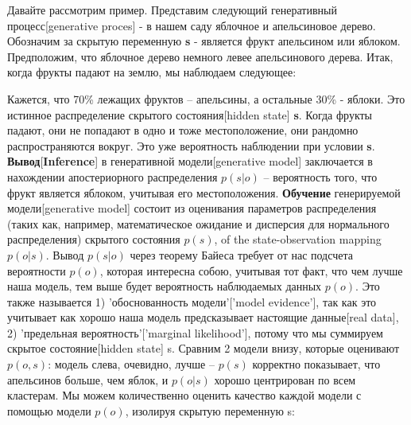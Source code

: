 \documentclass[twoside,leqno, 11pt]{article}
\begin{document}
	Давайте рассмотрим пример. Представим следующий генеративный процесс[generative proces] - в нашем саду яблочное и апельсиновое дерево. Обозначим за скрытую переменную \textbf{s} - является фрукт апельсином или яблоком. Предположим, что яблочное дерево немного левее апельсинового дерева. Итак, когда фрукты падают на землю, мы наблюдаем следующее:

	\begin{figure}[h]
		\label{ris:image}
	\end{figure}
	
	Кажется, что 70\% лежащих фруктов -- апельсины, а остальные 30\% - яблоки. Это истинное распределение скрытого состояния[hidden state] \textbf{s}. Когда фрукты падают, они не попадают в одно и тоже местоположение, они рандомно распространяются вокруг. Это уже вероятность наблюдении при условии \textbf{s}. \textbf{Вывод}[\textbf{Inference}] в генеративной модели[generative model] заключается в нахождении апостериорного распределения $p(s|o)$ -- вероятность того, что фрукт является яблоком, учитывая его местоположения. \textbf{Обучение} генерируемой модели[generative model] состоит из оценивания параметров распределения (таких как, например, математическое ожидание и дисперсия для нормального распределения) скрытого состояния $p(s)$, of the state-observation mapping $p(o|s)$. Вывод $p(s|o)$ через теорему Байеса требует от нас подсчета вероятности $p(o)$, которая интересна собою, учитывая тот факт, что чем лучше наша модель, тем выше будет вероятность наблюдаемых данных $p(o)$. Это также называется 1) 'обоснованность модели'['model evidence'], так как это учитывает как хорошо наша модель предсказывает настоящие данные[real data], 2) 'предельная вероятность'['marginal likelihood'],  потому что мы суммируем скрытое состояние[hidden state] s.
	Сравним 2 модели внизу, которые оценивают $p(o,s)$: модель слева, очевидно, лучше -- $p(s)$ корректно показывает, что апельсинов больше, чем яблок, и $p(o|s)$ хорошо центрирован по всем кластерам. Мы можем количественно оценить качество каждой модели с помощью модели $p(o)$, изолируя скрытую переменную s:
	
\end{document}
